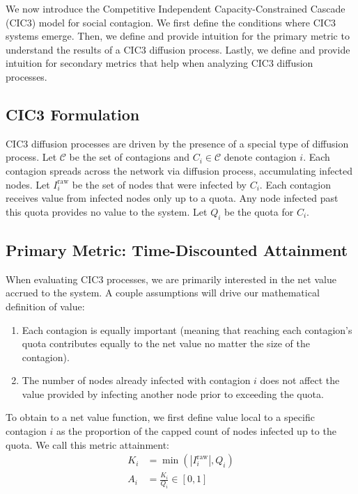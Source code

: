 \documentclass[sigconf]{acmart}
\begin{document}
We now introduce the Competitive Independent Capacity-Constrained Cascade (CIC3) model for social contagion. We first define the conditions where CIC3 systems emerge. Then, we define and provide intuition for the primary metric to understand the results of a CIC3 diffusion process. Lastly, we define and provide intuition for secondary metrics that help when analyzing CIC3 diffusion processes.

\subsection{CIC3 Formulation}
\label{subsec:formulation}

CIC3 diffusion processes are driven by the presence of a special type of diffusion process. Let $\mathcal{C}$ be the set of contagions and $C_i \in \mathcal{C}$ denote contagion $i$. Each contagion spreads across the network via diffusion process, accumulating infected nodes. Let $I_i^{\text{raw}}$ be the set of nodes that were infected by $C_i$. Each contagion receives value from infected nodes only up to a quota. Any node infected past this quota provides no value to the system. Let $Q_i$ be the quota for $C_i$.

\subsection{Primary Metric: Time-Discounted Attainment}
\label{subsec:attainment}

When evaluating CIC3 processes, we are primarily interested in the net value accrued to the system. A couple assumptions will drive our mathematical definition of value:
\begin{enumerate}
    \item Each contagion is equally important (meaning that reaching each contagion's quota contributes equally to the net value no matter the size of the contagion).
    \item The number of nodes already infected with contagion $i$ does not affect the value provided by infecting another node prior to exceeding the quota.
\end{enumerate}

To obtain to a net value function, we first define value local to a specific contagion $i$ as the proportion of the capped count of nodes infected up to the quota. We call this metric attainment:
\begin{align}
    K_i &= \min(|I_i^{\text{raw}}|, Q_i) \\
    A_i &= \frac{K_i}{Q_i} \in [0, 1]
\end{align}
\end{document}
